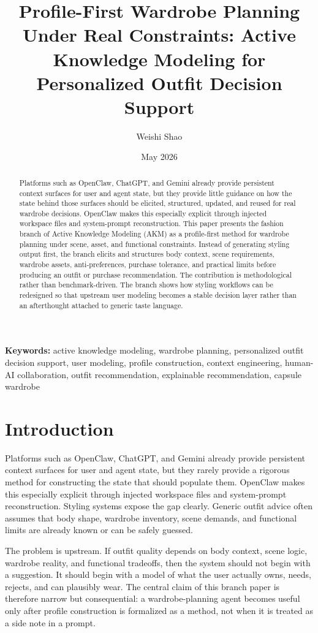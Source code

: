 \documentclass[11pt]{article}
\title{Profile-First Wardrobe Planning Under Real Constraints: Active Knowledge Modeling for Personalized Outfit Decision Support}
\author{Weishi Shao}
\date{May 2026}
\begin{document}
\maketitle

\begin{abstract}
Platforms such as OpenClaw, ChatGPT, and Gemini already provide persistent context surfaces for user and agent state, but they provide little guidance on how the state behind those surfaces should be elicited, structured, updated, and reused for real wardrobe decisions. OpenClaw makes this especially explicit through injected workspace files and system-prompt reconstruction. This paper presents the fashion branch of Active Knowledge Modeling (AKM) as a profile-first method for wardrobe planning under scene, asset, and functional constraints. Instead of generating styling output first, the branch elicits and structures body context, scene requirements, wardrobe assets, anti-preferences, purchase tolerance, and practical limits before producing an outfit or purchase recommendation. The contribution is methodological rather than benchmark-driven. The branch shows how styling workflows can be redesigned so that upstream user modeling becomes a stable decision layer rather than an afterthought attached to generic taste language.
\end{abstract}

\textbf{Keywords:} active knowledge modeling, wardrobe planning, personalized outfit decision support, user modeling, profile construction, context engineering, human-AI collaboration, outfit recommendation, explainable recommendation, capsule wardrobe

\section{Introduction}

Platforms such as OpenClaw, ChatGPT, and Gemini already provide persistent context surfaces for user and agent state, but they rarely provide a rigorous method for constructing the state that should populate them. OpenClaw makes this especially explicit through injected workspace files and system-prompt reconstruction. Styling systems expose the gap clearly. Generic outfit advice often assumes that body shape, wardrobe inventory, scene demands, and functional limits are already known or can be safely guessed.

The problem is upstream. If outfit quality depends on body context, scene logic, wardrobe reality, and functional tradeoffs, then the system should not begin with a suggestion. It should begin with a model of what the user actually owns, needs, rejects, and can plausibly wear. The central claim of this branch paper is therefore narrow but consequential: a wardrobe-planning agent becomes useful only after profile construction is formalized as a method, not when it is treated as a side note in a prompt.
\end{document}
